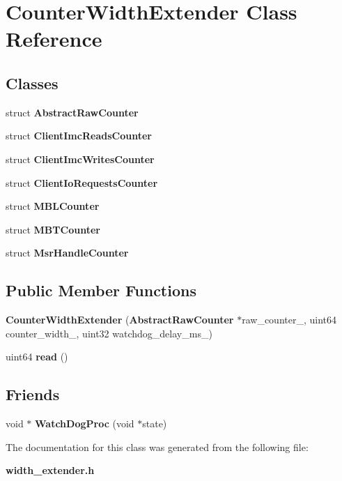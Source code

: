 \section{Counter\+Width\+Extender Class Reference}
\label{classCounterWidthExtender}
\subsection*{Classes}
\begin{DoxyCompactItemize}
\item 
struct {\bf Abstract\+Raw\+Counter}
\item 
struct {\bf Client\+Imc\+Reads\+Counter}
\item 
struct {\bf Client\+Imc\+Writes\+Counter}
\item 
struct {\bf Client\+Io\+Requests\+Counter}
\item 
struct {\bf M\+B\+L\+Counter}
\item 
struct {\bf M\+B\+T\+Counter}
\item 
struct {\bf Msr\+Handle\+Counter}
\end{DoxyCompactItemize}
\subsection*{Public Member Functions}
\begin{DoxyCompactItemize}
\item 
{\bfseries Counter\+Width\+Extender} ({\bf Abstract\+Raw\+Counter} $\ast$raw\+\_\+counter\+\_\+, uint64 counter\+\_\+width\+\_\+, uint32 watchdog\+\_\+delay\+\_\+ms\+\_\+)\label{classCounterWidthExtender_a3d82385d83e31ef043103407883ee0fd}

\item 
uint64 {\bfseries read} ()\label{classCounterWidthExtender_a481ee1b6002b489711f7c8f2e17729f3}

\end{DoxyCompactItemize}
\subsection*{Friends}
\begin{DoxyCompactItemize}
\item 
void $\ast$ {\bfseries Watch\+Dog\+Proc} (void $\ast$state)\label{classCounterWidthExtender_a13b3112e6cc7354fd6fb7c7605c781f4}

\end{DoxyCompactItemize}


The documentation for this class was generated from the following file\+:\begin{DoxyCompactItemize}
\item 
{\bf width\+\_\+extender.\+h}\end{DoxyCompactItemize}
